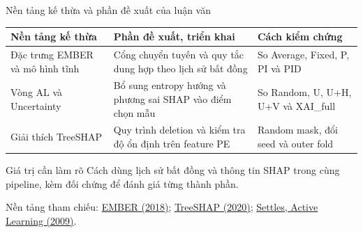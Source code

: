 \documentclass[aspectratio=169,10pt]{beamer}
\newcommand{\key}[1]{\textcolor{UETBlue}{\textbf{#1}}}
\begin{document}
\begin{frame}{Nền tảng kế thừa và phần đề xuất của luận văn}
\small
\renewcommand{\arraystretch}{1.38}
\begin{tabularx}{\textwidth}{@{}P{.24\textwidth}Y P{.24\textwidth}@{}}
\toprule
\key{Nền tảng kế thừa} & \key{Phần đề xuất, triển khai} & \key{Cách kiểm chứng}\\
\midrule
Đặc trưng EMBER và mô hình tĩnh & Cổng chuyển tuyến và quy tắc dung hợp theo lịch sử bất đồng & So Average, Fixed, P, PI và PID\\
Vòng AL và Uncertainty & Bổ sung entropy hướng và phương sai SHAP vào điểm chọn mẫu & So Random, U, U+H, U+V và XAI\_full\\
Giải thích TreeSHAP & Quy trình deletion và kiểm tra độ ổn định trên feature PE & Random mask, đổi seed và outer fold\\
\bottomrule
\end{tabularx}
\vspace{.12cm}
\begin{block}{Giá trị cần làm rõ}
Cách dùng lịch sử bất đồng và thông tin SHAP trong cùng pipeline, kèm đối chứng để đánh giá từng thành phần.
\end{block}
{\scriptsize\color{UETGray}Nền tảng tham chiếu:
\href{https://arxiv.org/abs/1804.04637}{EMBER (2018)};
\href{https://doi.org/10.1038/s42256-019-0138-9}{TreeSHAP (2020)};
\href{https://research.cs.wisc.edu/techreports/2009/TR1648.pdf}{Settles, Active Learning (2009)}.\par}
\end{frame}
\end{document}

